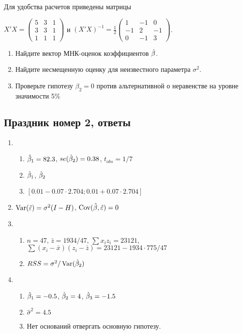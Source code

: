 \documentclass[12pt, a4paper]{article}
\theoremstyle{definition}
\begin{document}
\begin{enumerate}
Для удобства расчетов приведены матрицы


$X'X=\left(
\begin{array}{ccc}
5 & 3 & 1\\
3 & 3 & 1\\
1 & 1 & 1
\end{array}\right)$ и $(X'X)^{-1}=\frac{1}{2}\left(
\begin{array}{ccc}
1 & -1 & 0 \\
-1 & 2 & -1 \\
0 & -1 & 3
\end{array}\right)$.

\begin{enumerate}
\item Найдите вектор МНК-оценок коэффициентов $\hat{\beta}$.
\item Найдите несмещенную оценку для неизвестного параметра $\sigma^2$.
\item Проверьте гипотезу $\beta_2=0$ против альтернативной о неравенстве на уровне значимости 5\%
\end{enumerate}


\end{enumerate}



\subsection{Праздник номер 2, ответы}

\begin{enumerate}
\item
\begin{enumerate}
\item $\hat{\beta}_1 = 82.3$, $se(\hat{\beta}_2) = 0.38$, $t_{obs} = 1/7$
\item $\hat{\beta}_1$, $\hat{\beta}_2$
\item $[0.01 - 0.07 \cdot 2.704; 0.01 + 0.07 \cdot 2.704]$
\end{enumerate}
\item $\operatorname{Var}(\hat{\varepsilon}) = \sigma^2 (I - H)$, $\operatorname{Cov}(\hat{\beta},\hat{\varepsilon}) = 0$
\item
\begin{enumerate}
\item $n = 47$, $\bar{z} = 1934 / 47$, $\sum x_i z_i = 23121$, $\sum(x_i-\bar{x})(z_i-\bar{z}) = 23121 - 1934 \cdot 775 / 47$
\item $RSS = \sigma^2 / \operatorname{Var}(\hat{\beta}_2)$
\end{enumerate}
\item
\begin{enumerate}
\item $\hat{\beta}_1 = -0.5$, $\hat{\beta}_2 = 4$, $\hat{\beta}_3 = -1.5$
\item $\hat{\sigma}^2 = 4.5$
\item Нет оснований отвергать основную гипотезу.
\end{enumerate}
\end{enumerate}
\end{document}

